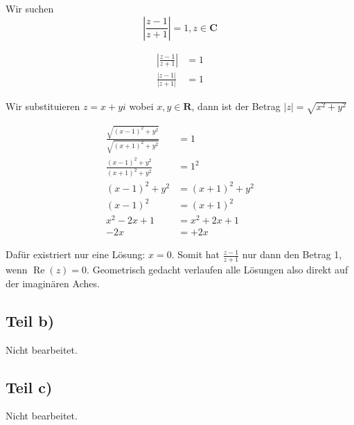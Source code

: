 \documentclass[a4paper,german,12pt]{article}
\begin{document}
Wir suchen $$\left|\frac{z-1}{z+1}\right| = 1, z \in \mathbf{C}$$

\begin{align}
\left|\frac{z-1}{z+1}\right| &= 1 \\
\frac{|z-1|}{|z+1|} &= 1
\end{align}

Wir substituieren $z = x+yi$ wobei $x,y \in \mathbf{R}$, dann ist der Betrag
$|z| = \sqrt{x^2+y^2}$

\begin{align}
\frac{\sqrt{(x-1)^2+y^2}}{\sqrt{(x+1)^2+y^2}} &= 1 \\
\frac{(x-1)^2+y^2}{(x+1)^2+y^2} &= 1^2 \\
(x-1)^2+y^2 &= (x+1)^2+y^2 \\
(x-1)^2 &= (x+1)^2 \\
x^2-2x+1 &= x^2+2x+1 \\
-2x &= +2x
\end{align}

Dafür existriert nur eine Lösung: $x = 0$. Somit hat $\frac{z-1}{z+1}$ nur dann den
Betrag 1, wenn $\operatorname{Re}(z) = 0$. Geometrisch gedacht verlaufen
alle Lösungen also direkt auf der imaginären Aches.

\subsection*{Teil b)}

Nicht bearbeitet.

\subsection*{Teil c)}

Nicht bearbeitet.
\end{document}
